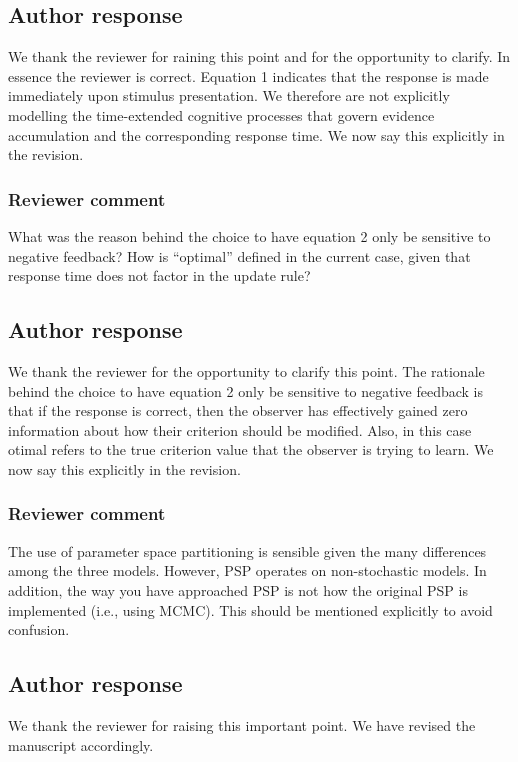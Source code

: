 \documentclass[12pt]{article}
\begin{document}
\subsection{Author response}
We thank the reviewer for raining this point and for the
opportunity to clarify. In essence the reviewer is correct.
Equation 1 indicates that the response is made immediately
upon stimulus presentation. We therefore are not explicitly
modelling the time-extended cognitive processes that govern
evidence accumulation and the corresponding response time.
We now say this explicitly in the revision.

\subsubsection{Reviewer comment}
What was the reason behind the choice to have equation 2
only be sensitive to negative feedback? How is ``optimal''
defined in the current case, given that response time does
not factor in the update rule?

\subsection{Author response}
We thank the reviewer for the opportunity to clarify this
point. The rationale behind the choice to have equation 2
only be sensitive to negative feedback is that if the
response is correct, then the observer has effectively
gained zero information about how their criterion should be
modified. Also, in this case otimal refers to the true
criterion value that the observer is trying to learn. We now
say this explicitly in the revision.

\subsubsection{Reviewer comment}
The use of parameter space partitioning is sensible given
the many differences among the three models. However, PSP
operates on non-stochastic models. In addition, the way you
have approached PSP is not how the original PSP is
implemented (i.e., using MCMC). This should be mentioned
explicitly to avoid confusion.

\subsection{Author response}
We thank the reviewer for raising this important point. We
have revised the manuscript accordingly.
\end{document}
